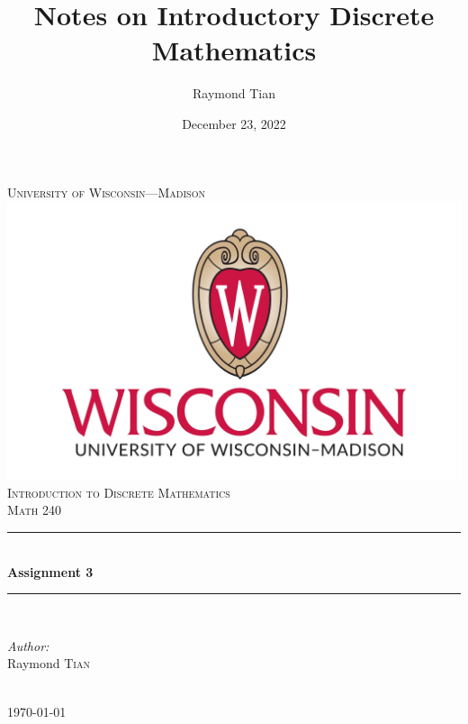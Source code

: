 \documentclass{report}
\title{Notes on Introductory Discrete Mathematics}
\author{Raymond Tian}
\date{December 23, 2022}
\theoremstyle{mytheoremstyle}
\theoremstyle{mytheoremstyle}
\theoremstyle{myproblemstyle}
\begin{document}
\begin{titlepage}
\newcommand{\HRule}{\rule{\linewidth}{0.5mm}}  
\begin{center}
\textsc{\LARGE University of Wisconsin---Madison}\\[1.5cm] 
\includegraphics[scale=.1]{../../images/uw-logo.png}\\[1cm] 
\textsc{\Large Introduction to Discrete Mathematics}\\[0.5cm] 
\textsc{\large Math 240}\\[0.5cm] 

\HRule \\[0.4cm]
{ \huge \bfseries Assignment 3}\\[0.4cm] 
\HRule \\[1.5cm]

\begin{minipage}{0.4\textwidth}
\begin{flushleft} \large
\emph{Author:}\\
Raymond \textsc{Tian}\\ 
\end{flushleft}

\end{minipage}\\[2cm]

{\large \today}\\[2cm] 

\vfill 

\end{center}
\end{titlepage}

\pagestyle{empty}
\newpage
\pagestyle{fancy}
\newpage
\end{document}
